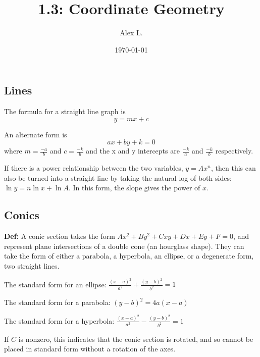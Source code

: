 \documentclass{article}
\title{1.3: Coordinate Geometry}
\author{Alex L.}
\date{\today}
\begin{document}
\maketitle

\subsection{Lines}

The formula for a straight line graph is $$y = mx+c$$

An alternate form is $$ax + by + k = 0$$
where $m = \frac{-a}{b}$ and $c = \frac{-k}{b}$
and the x and y intercepts are $\frac{-k}{a}$ and $\frac{-k}{b}$ respectively.

If there is a power relationship between the two variables, $y = Ax^n$, then this can also be turned into a straight line by taking the natural log of both sides: $\ln y = n\ln x + \ln A$. In this form, the slope gives the power of $x$.

\subsection{Conics}

\textbf{Def:} A conic section takes the form $Ax^2 + By^2 + Cxy + Dx + Ey + F = 0$, and represent plane intersections of a double cone (an hourglass shape). They can take the form of either a parabola, a hyperbola, an ellipse, or a degenerate form, two straight lines. 

The standard form for an ellipse: $\frac{(x-a)^2}{a^2} + \frac{(y-b)^2}{b^2} = 1$

The standard form for a parabola: $(y-b)^2 = 4a(x-a)$

The standard form for a hyperbola: $\frac{(x-a)^2}{a^2} - \frac{(y-b)^2}{b^2} = 1$

If $C$ is nonzero, this indicates that the conic section is rotated, and so cannot be placed in standard form without a rotation of the axes.
\end{document}
